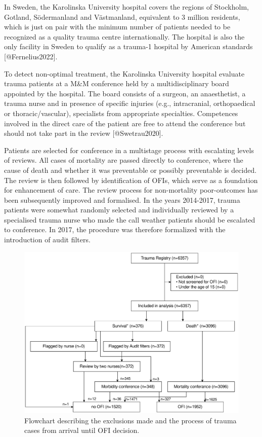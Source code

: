 \documentclass[
]{article}
\begin{document}
In Sweden, the Karolinska University hospital covers the regions of
Stockholm, Gotland, Södermanland and Västmanland, equivalent to 3
million residents, which is just on pair with the minimum number of
patients needed to be recognized as a quality trauma centre
internationally. The hospital is also the only facility in Sweden to
qualify as a trauma-1 hospital by American standards
{[}@Fernelius2022{]}.

To detect non-optimal treatment, the Karolinska University hospital
evaluate trauma patients at a M\&M conference held by a
multidisciplinary board appointed by the hospital. The board consists of
a surgeon, an anaesthetist, a trauma nurse and in presence of specific
injuries (e.g., intracranial, orthopaedical or thoracic/vascular),
specialists from appropriate specialties. Competences involved in the
direct care of the patient are free to attend the conference but should
not take part in the review {[}@Swetrau2020{]}.

Patients are selected for conference in a multistage process with
escalating levels of reviews. All cases of mortality are passed directly
to conference, where the cause of death and whether it was preventable
or possibly preventable is decided. The review is then followed by
identification of OFIs, which serve as a foundation for enhancement of
care. The review process for non-mortality poor-outcomes has been
subsequently improved and formalised. In the years 2014-2017, trauma
patients were somewhat randomly selected and individually reviewed by a
specialised trauma nurse who made the call weather patients should be
escalated to conference. In 2017, the procedure was therefore formalized
with the introduction of audit filters.

\begin{figure}

{\centering \includegraphics[width=1\linewidth]{ofi-flowchart} 

}

\caption{ Flowchart describing the exclusions made and the process of trauma cases from arrival until OFI decision.}\label{fig:ofi-flowchart}
\end{figure}
\end{document}
